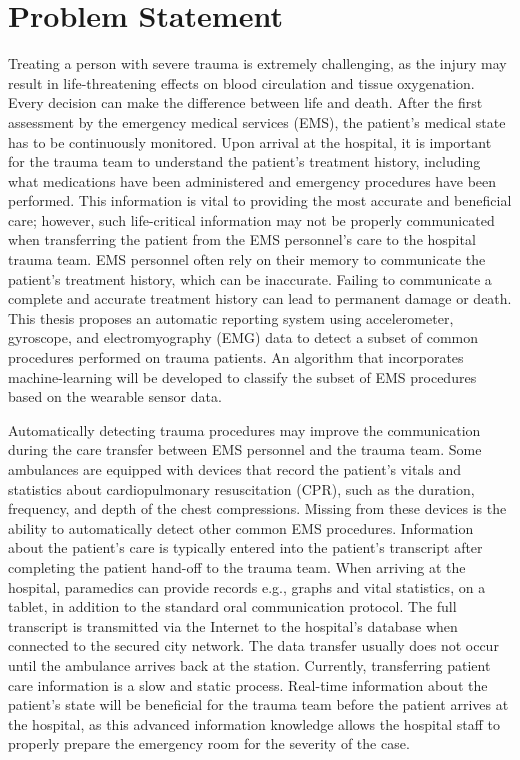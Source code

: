 
\chapter{Problem Statement}
\label{ch:Problem-Statement}

Treating a person with severe trauma is extremely challenging, as the injury may result in life-threatening effects on blood circulation and tissue oxygenation. Every decision can make the difference between life and death. After the first assessment by the emergency medical services (\gls{EMS}), the patient's medical state has to be continuously monitored. Upon arrival at the hospital, it is important for the trauma team to understand the patient's treatment history, including what medications have been administered and emergency procedures have been performed. This information is vital to providing the most accurate and beneficial care; however, such life-critical information may not be properly communicated when transferring the patient from the \gls{EMS} personnel's care to the hospital trauma team. \gls{EMS} personnel often rely on their memory to communicate the patient's treatment history, which can be inaccurate. Failing to communicate a complete and accurate treatment history can lead to permanent damage or death. This thesis proposes an automatic reporting system using accelerometer, gyroscope, and electromyography (\gls{EMG}) data to detect a subset of common procedures performed on trauma patients. An algorithm that incorporates machine-learning will be developed to classify the subset of \gls{EMS} procedures based on the wearable sensor data.
\par Automatically detecting trauma procedures may improve the communication during the care transfer between EMS personnel and the trauma team. Some ambulances are equipped with devices that record the patient's vitals and statistics about cardiopulmonary resuscitation (\gls{CPR}), such as the duration, frequency, and depth of the chest compressions. Missing from these devices is the ability to automatically detect other common EMS procedures. Information about the patient's care is typically entered into the patient's transcript after completing the patient hand-off to the trauma team. When arriving at the hospital, paramedics can provide records e.g., graphs and vital statistics, on a tablet, in addition to the standard oral communication protocol. The full transcript is transmitted via the Internet to the hospital's database when connected to the secured city network. The data transfer usually does not occur until the ambulance arrives back at the station. Currently, transferring patient care information is a slow and static process. Real-time information about the patient's state will be beneficial for the trauma team before the patient arrives at the hospital, as this advanced information knowledge allows the hospital staff to properly prepare the emergency room for the severity of the case.
